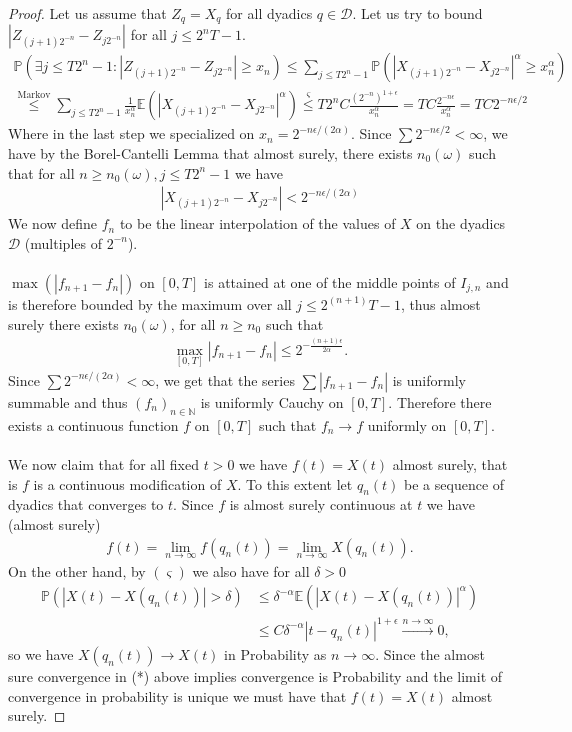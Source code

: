 \documentclass[../mainfile.tex]{subfiles}
\begin{document}
\begin{proof}
Let us assume that $Z_q=X_q$ for all dyadics $q \in \mathcal{D}$. Let us try to bound $|Z_{(j+1)2^{-n}}-Z_{j2^{-n}}|$ for all $j \leq 2^nT-1$. 
\begin{align*}
\mathbb{P}( \exists j \leq T2^n-1: |Z_{(j+1)2^{-n}}-Z_{j2^{-n}}| \geq x_n) \leq \sum_{j \leq T2^n-1} \mathbb{P}(|X_{(j+1)2^{-n}}-X_{j2^{-n}}|^\alpha \geq x_n^\alpha ) \\
\overset{\text{Markov}}\leq \sum_{j \leq T2^n-1} \frac{1}{x_n^\alpha} \mathbb{E}(|X_{(j+1)2^{-n}}-X_{j2^{-n}}|^\alpha) \overset{\varsigma}\leq T2^n C \frac{(2^{-n})^{1 + \epsilon}}{x_n^\alpha} = TC \frac{2^{-n \epsilon}}{x_n^\alpha} = TC 2^{-n \epsilon /2}
\end{align*}
Where in the last step we specialized on $x_n= 2^{-n \epsilon / (2 \alpha)}$. Since $\sum 2^{-n \epsilon/2} < \infty$, we have by the Borel-Cantelli Lemma that almost surely, there exists $n_0(\omega)$ such that for all $n \geq n_0(\omega), j \leq T2^n-1$ we have 
\begin{align*}
|X_{(j+1)2^{-n}}-X_{j2^{-n}}| < 2^{-n \epsilon /(2 \alpha)}
\end{align*}
\newpage
We now define $f_n$ to be the linear interpolation of the values of $X$ on the dyadics $\mathcal{D}$ (multiples of $2^{-n}$). \\\\
$\max ( |f_{n+1}-f_n|)$ on $[0,T]$ is attained at one of the middle points of $I_{j,n}$ and is therefore bounded by the maximum over all $j \leq 2^{(n+1)}T-1$, thus almost surely there exists $n_0(\omega)$, for all $n \geq n_0$ such that \begin{align*}
\max_{[0,T]} |f_{n+1}-f_n| \leq 2^{-\frac{(n+1) \epsilon}{2 \alpha}}.
\end{align*}
Since $\sum 2^{-n \epsilon/( 2 \alpha)} < \infty$, we get that the series $\sum |f_{n+1}-f_n|$ is uniformly summable and thus $(f_n)_{n \in \mathbb{N}}$ is uniformly Cauchy on $[0,T]$. Therefore there exists a continuous function $f$ on $[0,T]$ such that $f_n \to f$ uniformly on $[0,T]$.
\\\\
We now claim that for all fixed $t>0$ we have $f(t)=X(t)$ almost surely, that is $f$ is a continuous modification of $X$. To this extent let $q_n(t)$ be a sequence of dyadics that converges to $t$. Since $f$ is almost surely continuous at $t$ we have (almost surely)
\begin{align*}
f(t)=\lim_{n \to \infty} f(q_n(t)) = \lim_{n \to \infty} X(q_n(t)). \tag{*}
\end{align*}
On the other hand, by $( \varsigma)$ we also have for all $\delta >0$
\begin{align*}
\mathbb{P}(|X(t)-X(q_n(t))| > \delta ) &\leq \delta^{-\alpha} \mathbb{E}(|X(t)-X(q_n(t))|^\alpha) \\ &\leq C \delta^{- \alpha} |t-q_n(t)|^{1 + \epsilon} \overset{n \to \infty}\longrightarrow 0,
\end{align*}
so we have $X(q_n(t)) \to X(t)$ in Probability as $n \to \infty$. Since the almost sure convergence in (*) above implies convergence is Probability and the limit of convergence in probability is unique we must have that $f(t)=X(t)$ almost surely. 
\end{proof}
\end{document}
